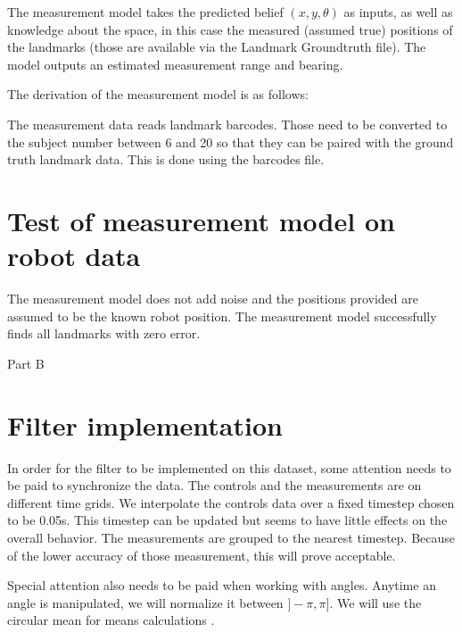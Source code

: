 \documentclass{article}
\begin{document}
The measurement model takes the predicted belief $(x, y, \theta)$ as inputs, as well as knowledge about the space, in this case the measured (assumed true) positions of the landmarks (those are available via the Landmark Groundtruth file).
The model outputs an estimated measurement range and bearing.

The derivation of the measurement model is as follows:

The measurement data reads landmark barcodes. Those need to be converted to the subject number between 6 and 20 so that they can be paired with the ground truth landmark data. This is done using the barcodes file.


\section{Test of measurement model on robot data}
The measurement model does not add noise and the positions provided are assumed to be the known robot position. The measurement model successfully finds all landmarks with zero error.

\vspace{1cm}
\large{Part B}
\normalsize{}

\section{Filter implementation}

In order for the filter to be implemented on this dataset, some attention needs to be paid to synchronize the data. The controls and the measurements are on different time grids. We interpolate the controls data over a fixed timestep chosen to be 0.05s. This timestep can be updated but seems to have little effects on the overall behavior. The measurements are grouped to the nearest timestep. Because of the lower accuracy of those measurement, this will prove acceptable.

Special attention also needs to be paid when working with angles. Anytime an angle is manipulated, we will normalize it between $]-\pi,\pi]$. We will use the circular mean for means calculations \cite{wiki:circular_mean}.
\end{document}
